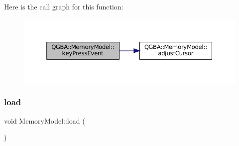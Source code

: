 Here is the call graph for this function\+:
\nopagebreak
\begin{figure}[H]
\begin{center}
\leavevmode
\includegraphics[width=350pt]{class_q_g_b_a_1_1_memory_model_a3a0ea3d2970136697f0b151e58521a2f_cgraph}
\end{center}
\end{figure}
\mbox{\label{class_q_g_b_a_1_1_memory_model_a0bb208ac899a5d6114c24bf2dcd73955}} 
\subsubsection{\texorpdfstring{load}{load}}
{\footnotesize\ttfamily void Memory\+Model\+::load (\begin{DoxyParamCaption}{ }\end{DoxyParamCaption})\hspace{0.3cm}{\ttfamily [slot]}}

